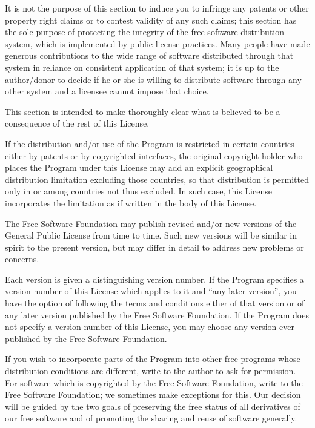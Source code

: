 \documentclass[%
	11pt,
        a4paper,
        twoside]{workrep}
\begin{document}
It is not the purpose of this section to induce you to infringe any
patents or other property right claims or to contest validity of any
such claims; this section has the sole purpose of protecting the
integrity of the free software distribution system, which is
implemented by public license practices.  Many people have made
generous contributions to the wide range of software distributed
through that system in reliance on consistent application of that
system; it is up to the author/donor to decide if he or she is willing
to distribute software through any other system and a licensee cannot
impose that choice.

This section is intended to make thoroughly clear what is believed to
be a consequence of the rest of this License.

\gnuitem %
If the distribution and/or use of the Program is restricted in
certain countries either by patents or by copyrighted interfaces, the
original copyright holder who places the Program under this License
may add an explicit geographical distribution limitation excluding
those countries, so that distribution is permitted only in or among
countries not thus excluded.  In such case, this License incorporates
the limitation as if written in the body of this License.

\gnuitem %
The Free Software Foundation may publish revised and/or new versions
of the General Public License from time to time.  Such new versions will
be similar in spirit to the present version, but may differ in detail to
address new problems or concerns.

Each version is given a distinguishing version number.  If the Program
specifies a version number of this License which applies to it and ``any
later version'', you have the option of following the terms and conditions
either of that version or of any later version published by the Free
Software Foundation.  If the Program does not specify a version number of
this License, you may choose any version ever published by the Free Software
Foundation.

\gnuitem %
If you wish to incorporate parts of the Program into other free
programs whose distribution conditions are different, write to the author
to ask for permission.  For software which is copyrighted by the Free
Software Foundation, write to the Free Software Foundation; we sometimes
make exceptions for this.  Our decision will be guided by the two goals
of preserving the free status of all derivatives of our free software and
of promoting the sharing and reuse of software generally.
\end{document}
